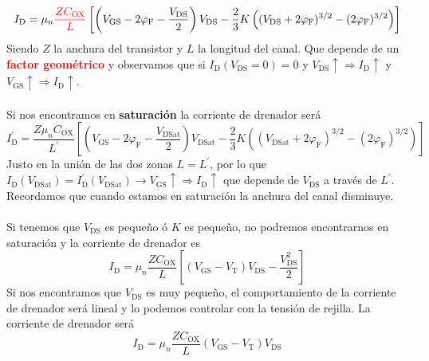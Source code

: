 \begin{equation}
    I_\mathrm{D}=\mu_n \textcolor{red}{\frac{Z C_\mathrm{OX}}{L}} \left [ \left( V_\mathrm{GS}-2\varphi_\mathrm{F} -\frac{V_\mathrm{DS}}{2}\right)V_\mathrm{DS}-\frac{2}{3}K\left( (V_\mathrm{DS}+2\varphi_\mathrm{F})^{3/2}- (2\varphi_\mathrm{F})^{3/2} \right ) \right ]
    \label{eq: Corriente de drenador en no saturacion general}
\end{equation}
Siendo $Z$ la anchura del transistor y $L$ la longitud del canal. Que depende de un \textcolor{red}{\textbf{factor geométrico}} y observamos que si $I_\mathrm{D}(V_\mathrm{DS}=0)=0$ y $V_\mathrm{DS} \uparrow \Rightarrow I_\mathrm{D} \uparrow$ y $V_\mathrm{GS} \uparrow \Rightarrow I_\mathrm{D} \uparrow$.\\\\
Si nos encontramos en \textbf{saturación} la corriente de drenador será  
\begin{equation}
    I^{'}_\mathrm{D}=\frac{Z\mu_nC_\mathrm{OX}}{L^{'}} \left [ \left( V_\mathrm{GS}-2\varphi_\mathrm{F} -\frac{V_\mathrm{DSat}}{2}\right)V_\mathrm{DSat}-\frac{2}{3}K\left( (V_\mathrm{DSat}+2\varphi_\mathrm{F})^{3/2}- (2\varphi_\mathrm{F})^{3/2} \right ) \right ]
    \label{eq: Corriente de drenador en saturacion general}
\end{equation}
Justo en la unión de las dos zonas $L=L^{'}$, por lo que $I_\mathrm{D}(V_\mathrm{DSat})=I^{'}_\mathrm{D}(V_\mathrm{DSat}) \xrightarrow{}  V_\mathrm{GS} \uparrow \Rightarrow I_\mathrm{D} \uparrow$ que depende de $V_\mathrm{DS}$ a través de $L^{'}$. Recordamos que cuando estamos en saturación la anchura del canal disminuye.\\\\
Si tenemos que $V_\mathrm{DS}$ es pequeño ó $K$ es pequeño, no podremos encontrarnos en saturación y la corriente de drenador es
\begin{equation}
    I_\mathrm{D}=\mu_n \frac{Z C_\mathrm{OX}}{L} \left [ ( V_\mathrm{GS}-V_\mathrm{T})V_\mathrm{DS}-\frac{V_\mathrm{DS}^2}{2} \right ]
    \label{eq: Corriente de drenador para VDS pequeño o K pequeño}
\end{equation}
Si nos encontramos que $V_\mathrm{DS}$ es muy pequeño, el comportamiento de la corriente de drenador será lineal y lo podemos controlar con la tensión de rejilla. La corriente de drenador será
\begin{equation}
        I_\mathrm{D}=\mu_n \frac{Z C_\mathrm{OX}}{L} ( V_\mathrm{GS}-V_\mathrm{T})V_\mathrm{DS}
        \label{eq: Corriente de drenador para VDS muy pequeño}
\end{equation}
